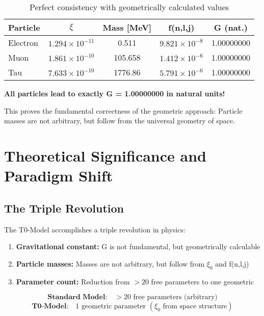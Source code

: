 \documentclass[12pt,a4paper]{article}
\begin{document}
	\begin{table}[h]
		\centering
		\begin{tabular}{@{}lcccc@{}}
			\toprule
			\textbf{Particle} & \textbf{$\xi$} & \textbf{Mass [MeV]} & \textbf{f(n,l,j)} & \textbf{G (nat.)} \\
			\midrule
			Electron & $1.294 \times 10^{-11}$ & 0.511 & $9.821 \times 10^{-8}$ & 1.00000000 \\
			Muon & $1.861 \times 10^{-10}$ & 105.658 & $1.412 \times 10^{-6}$ & 1.00000000 \\
			Tau & $7.633 \times 10^{-10}$ & 1776.86 & $5.791 \times 10^{-6}$ & 1.00000000 \\
			\bottomrule
		\end{tabular}
		\caption{Perfect consistency with geometrically calculated values}
	\end{table}
	
	\begin{tcolorbox}[colback=green!5!white,colframe=green!75!black,title=Revolutionary Confirmation]
		\textbf{All particles lead to exactly G = 1.00000000 in natural units!}
		
		This proves the fundamental correctness of the geometric approach: Particle masses are not arbitrary, but follow from the universal geometry of space.
	\end{tcolorbox}
	
	\section{Theoretical Significance and Paradigm Shift}
	
	\subsection{The Triple Revolution}
	
	The T0-Model accomplishes a triple revolution in physics:
	
	\begin{enumerate}
		\item \textbf{Gravitational constant:} G is not fundamental, but geometrically calculable
		\item \textbf{Particle masses:} Masses are not arbitrary, but follow from $\xi_0$ and f(n,l,j)
		\item \textbf{Parameter count:} Reduction from $>20$ free parameters to one geometric
	\end{enumerate}
	
	\begin{equation}
		\textbf{Standard Model:} \quad >20 \text{ free parameters (arbitrary)}
	\end{equation}
	\begin{equation}
		\textbf{T0-Model:} \quad 1 \text{ geometric parameter } (\xi_0 \text{ from space structure})
	\end{equation}
	
\end{document}
